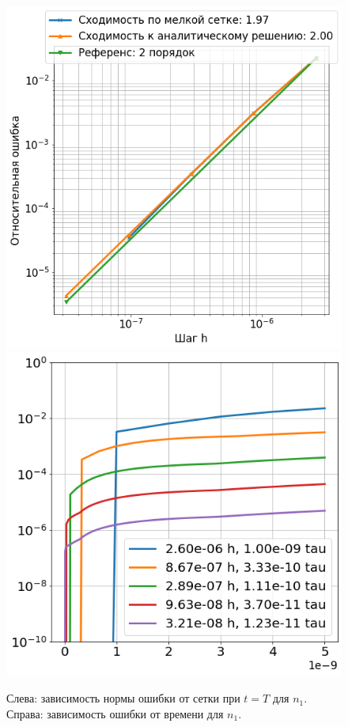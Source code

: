 \begin{figure}[H]
\centering
\includegraphics[width=.5\textwidth]{dhd_convergence/convergence_n1.png}\hfill
\includegraphics[width=.5\textwidth]{dhd_convergence/time_error_n1.png}
\caption{Слева: зависимость нормы ошибки от сетки при $t = T$ для $n_1$. Справа: зависимость ошибки от времени для $n_1$.}
\label{fig:dhd_convergence_n1}
\end{figure}


